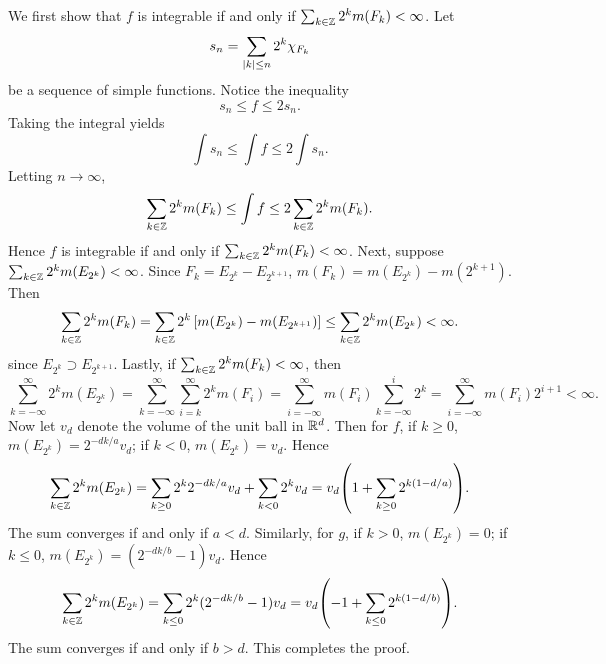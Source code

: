 \begin{pf}
    We first show that $f$ is integrable if and only if $\sum_{k\in\mathbb{Z}} 2^k m(F_k)<\infty$. 
    Let 
    \begin{equation*}
        s_n = \sum_{\left\lvert {k} \right\rvert\leq n} 2^k \chi_{F_k}
    \end{equation*}
    be a sequence of simple functions. Notice the inequality 
    \begin{equation*}
        s_n \leq f \leq 2s_n.
    \end{equation*}
    Taking the integral yields
    \begin{equation*}
        \int s_n \leq \int f \leq 2\int s_n.
    \end{equation*}
    Letting $n\to\infty$, 
    \begin{equation*}
        \sum_{k\in\mathbb{Z}} 2^k m(F_k) \leq \int f \leq 2\sum_{k\in\mathbb{Z}} 2^k m(F_k).
    \end{equation*}
    Hence $f$ is integrable if and only if $\sum_{k\in\mathbb{Z}} 2^k m(F_k)<\infty$. 
    Next, suppose $\sum_{k\in\mathbb{Z}} 2^k m(E_{2^k}) < \infty$.
    Since $F_k = E_{2^k}-E_{2^{k+1}}$, $m(F_k) = m(E_{2^k}) - m(2^{k+1})$. 
    Then 
    \begin{equation*}
        \sum_{k\in\mathbb{Z}} 2^k m(F_k) = \sum_{k\in\mathbb{Z}} 2^k \left[ {m(E_{2^k}) - m(E_{2^{k+1}})} \right] 
        \leq \sum_{k\in\mathbb{Z}} 2^k m(E_{2^k}) < \infty.
    \end{equation*}
    since $E_{2^k}\supset E_{2^{k+1}}$. 
    Lastly, if $\sum_{k\in\mathbb{Z}} 2^k m(F_k)<\infty$, then 
    \begin{equation*}
        \sum_{k=-\infty}^{\infty} 2^k m(E_{2^k}) 
        = \sum_{k=-\infty}^{\infty}\sum_{i=k}^{\infty} 2^k m(F_i) 
        = \sum_{i=-\infty}^{\infty} m(F_i) \sum_{k=-\infty}^{i} 2^k
        = \sum_{i=-\infty}^{\infty} m(F_i) 2^{i+1} < \infty.
    \end{equation*}
    Now let $v_d$ denote the volume of the unit ball in $\mathbb{R}^d$. 
    Then for $f$, if $k\geq 0$, $m(E_{2^k}) = 2^{-dk/a}v_d$; if 
    $k<0$, $m(E_{2^k}) = v_d$. Hence 
    \begin{equation*}
        \sum_{k\in\Z} 2^k m(E_{2^k}) = \sum_{k\geq 0} 2^k 2^{-dk/a}v_d + \sum_{k<0} 2^k v_d 
        = v_d\pth{1 + \sum_{k\geq 0} 2^{k(1-d/a)}}.
    \end{equation*}
    The sum converges if and only if $a<d$. Similarly, for $g$, if $k>0$, 
    $m(E_{2^k}) = 0$; if $k\leq 0$, $m(E_{2^k}) = (2^{-dk/b}-1)v_d$. Hence 
    \begin{equation*}
        \sum_{k\in\Z} 2^k m(E_{2^k}) = \sum_{k\leq 0} 2^k (2^{-dk/b}-1)v_d 
        = v_d\pth{-1 + \sum_{k\leq 0} 2^{k(1-d/b)}}.
    \end{equation*} 
    The sum converges if and only if $b>d$. This completes the proof.
\end{pf}

